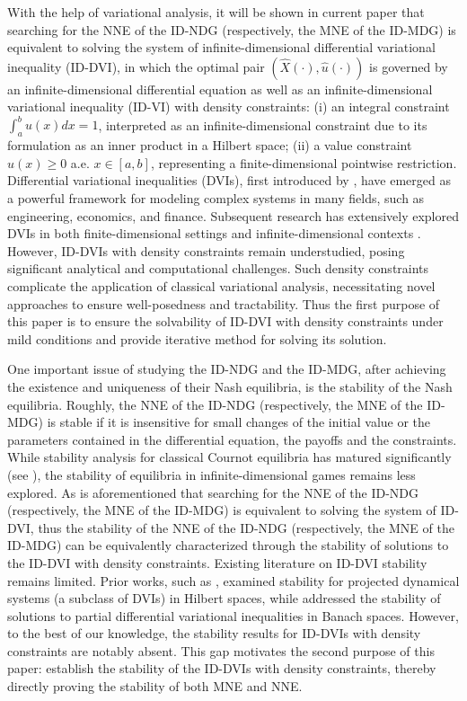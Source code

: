 \documentclass[10pt]{article}
\begin{document}
With the help of variational analysis, it will be shown in current paper that searching for the NNE of the ID-NDG (respectively, the MNE of the ID-MDG) is equivalent to solving the system of infinite-dimensional differential variational inequality (ID-DVI), in which the optimal pair $(\widehat{X}(\cdot),\widehat{u}(\cdot))$ is governed by an infinite-dimensional differential equation  as well as an infinite-dimensional variational inequality (ID-VI) with density constraints: (i)  an integral constraint $\int_a^bu(x)dx=1$, interpreted as an infinite-dimensional constraint due to its formulation as an inner product in a Hilbert space; (ii) a value constraint $u(x)\geq0$ a.e.  $x\in[a,b]$, representing a finite-dimensional pointwise restriction. Differential variational inequalities (DVIs), first introduced by \citet{MR2375486}, have emerged as a powerful framework for modeling complex systems in many fields, such as engineering, economics, and finance. Subsequent research has extensively explored DVIs in both finite-dimensional settings \citep{MR4512275, MR3091366, MR3232620, MR4248266, MR4676612, MR4561065} and infinite-dimensional contexts \citep{MR4924761, MR3070101, MR4596385, MR3670043, MR3581523, MR4408107}. However, ID-DVIs with density constraints remain understudied, posing significant analytical and computational challenges. Such density constraints complicate the application of classical variational analysis, necessitating novel approaches to ensure well-posedness and tractability. Thus the first purpose of this paper is to ensure the solvability of ID-DVI with density constraints under mild conditions and provide iterative method for solving its solution.

One important issue of studying   the ID-NDG and the ID-MDG, after achieving the existence and uniqueness of their Nash equilibria, is the stability  of the Nash equilibria. Roughly, the NNE of the ID-NDG (respectively, the MNE of the ID-MDG) is stable if it is  insensitive for small changes of the initial value or the parameters contained in the differential equation, the payoffs  and the constraints. While stability analysis for classical Cournot equilibria has matured significantly (see \citep{MR2917530, puu2008stability, wang2024stability, MR4426096}), the stability of equilibria in infinite-dimensional games remains less explored.  As is aforementioned   that  searching for the NNE of the ID-NDG (respectively, the MNE of the ID-MDG) is equivalent to solving the system of  ID-DVI, thus the stability   of the NNE of the ID-NDG (respectively, the MNE of the ID-MDG) can be equivalently characterized through  the stability of solutions to the ID-DVI with density constraints. Existing literature on ID-DVI stability remains limited. Prior works, such as \citet{MR3070101}, examined stability for projected dynamical systems (a subclass of DVIs) in Hilbert spaces, while  \citet{MR4066425} addressed the stability of solutions to partial differential variational inequalities in Banach spaces.  However, to the best of our knowledge, the stability results for ID-DVIs with density constraints are notably absent.  This gap motivates the second purpose of this paper: establish the stability of the ID-DVIs with  density constraints, thereby directly proving   the stability  of both   MNE and  NNE.
\end{document}
